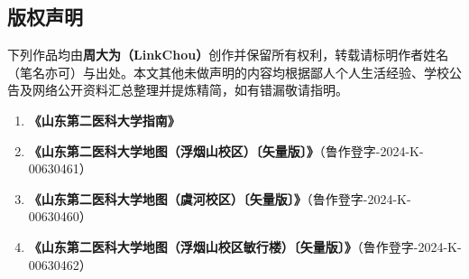 \label{copyright}
\subsection[版权声明]{版权声明}
下列作品均由\textbf{周大为（LinkChou）}创作并保留所有权利，转载请标明作者姓名（笔名亦可）与出处。本文其他未做声明的内容均根据鄙人个人生活经验、学校公告及网络公开资料汇总整理并提炼精简，如有错漏敬请指明。

\begin{enumerate}
    \item \textbf{《山东第二医科大学指南》}
    \item \textbf{《山东第二医科大学地图（浮烟山校区）〔矢量版〕》}（鲁作登字-2024-K-00630461）
    \item \textbf{《山东第二医科大学地图（虞河校区）〔矢量版〕》}（鲁作登字-2024-K-00630460）
    \item \textbf{《山东第二医科大学地图（浮烟山校区敏行楼）〔矢量版〕》}（鲁作登字-2024-K-00630462）
\end{enumerate}

